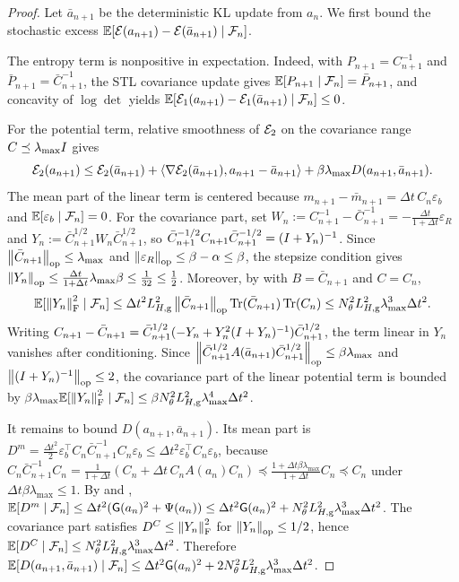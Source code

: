 \begin{proof}
Let $\bar a_{n+1}$ be the deterministic KL update from $a_n$. We first bound the stochastic
excess $\mathbb{E}[\mathcal{E}(a_{n+1})-\mathcal{E}(\bar a_{n+1})\mid\mathcal{F}_n]$.

The entropy term is nonpositive in expectation. Indeed, with $P_{n+1}=C_{n+1}^{-1}$ and
$\bar P_{n+1}=\bar C_{n+1}^{-1}$, the STL covariance update gives
$\mathbb{E}[P_{n+1}\mid\mathcal{F}_n]=\bar P_{n+1}$, and concavity of $\log\det$ yields
$\mathbb{E}[\mathcal{E}_1(a_{n+1})-\mathcal{E}_1(\bar a_{n+1})\mid\mathcal{F}_n]\leq0$.

For the potential term, relative smoothness of $\mathcal{E}_2$ on the covariance range
$C\preceq\lambda_{\max}I$ gives
\[
    \mathcal{E}_2(a_{n+1})
    \leq
    \mathcal{E}_2(\bar a_{n+1})
    +
    \left\langle \nabla\mathcal{E}_2(\bar a_{n+1}),a_{n+1}-\bar a_{n+1}\right\rangle
    +
    \beta\lambda_{\max}D(a_{n+1},\bar a_{n+1}).
\]
The mean part of the linear term is centered because
$m_{n+1}-\bar m_{n+1}=\Delta t\,C_n\varepsilon_b$ and
$\mathbb{E}[\varepsilon_b\mid\mathcal{F}_n]=0$. For the covariance part, set
$W_n:=C_{n+1}^{-1}-\bar C_{n+1}^{-1}=-\tfrac{\Delta t}{1+\Delta t}\varepsilon_R$ and
$Y_n:=\bar C_{n+1}^{1/2}W_n\bar C_{n+1}^{1/2}$, so
$\bar C_{n+1}^{-1/2}C_{n+1}\bar C_{n+1}^{-1/2}=(I+Y_n)^{-1}$.
Since $\left\lVert \bar C_{n+1}\right\rVert_{\mathrm{op}}\leq\lambda_{\max}$ and
$\left\lVert \varepsilon_R\right\rVert_{\mathrm{op}}\leq\beta-\alpha\leq\beta$, the stepsize condition gives
$\left\lVert Y_n\right\rVert_{\mathrm{op}}\leq\tfrac{\Delta t}{1+\Delta t}\lambda_{\max}\beta\leq\tfrac1{32}\leq\tfrac12$.
Moreover, by  with $B=\bar C_{n+1}$ and $C=C_n$,
\[
    \mathbb{E}[\left\lVert Y_n\right\rVert_{\mathrm{F}}^2\mid\mathcal{F}_n]
    \leq
    \Delta t^2
    L_{H,\mathrm g}^2\left\lVert \bar C_{n+1}\right\rVert_{\mathrm{op}}\operatorname{Tr}(\bar C_{n+1})\operatorname{Tr}(C_n)
    \leq
    N_\theta^2L_{H,\mathrm g}^2\lambda_{\max}^3\Delta t^2 .
\]
Writing
$C_{n+1}-\bar C_{n+1}=\bar C_{n+1}^{1/2}(-Y_n+Y_n^2(I+Y_n)^{-1})\bar C_{n+1}^{1/2}$,
the term linear in $Y_n$ vanishes after conditioning. Since
$\left\lVert \bar C_{n+1}^{1/2}A(\bar a_{n+1})\bar C_{n+1}^{1/2}\right\rVert_{\mathrm{op}}\leq\beta\lambda_{\max}$ and
$\left\lVert (I+Y_n)^{-1}\right\rVert_{\mathrm{op}}\leq2$, the covariance part of the linear potential term is bounded by
$\beta\lambda_{\max}\mathbb{E}[\left\lVert Y_n\right\rVert_{\mathrm{F}}^2\mid\mathcal{F}_n]\leq\beta N_\theta^2L_{H,\mathrm g}^2\lambda_{\max}^4\Delta t^2$.

It remains to bound $D(a_{n+1},\bar a_{n+1})$. Its mean part is
$D^m=\tfrac{\Delta t^2}{2}\varepsilon_b^\top C_n\bar C_{n+1}^{-1}C_n\varepsilon_b\leq\Delta t^2\varepsilon_b^\top C_n\varepsilon_b$,
because
$C_n\bar C_{n+1}^{-1}C_n=\tfrac1{1+\Delta t}(C_n+\Delta t\,C_nA(a_n)C_n)\preceq\tfrac{1+\Delta t\beta\lambda_{\max}}{1+\Delta t}C_n\preceq C_n$
under $\Delta t\beta\lambda_{\max}\leq1$. By  and ,
$\mathbb{E}[D^m\mid\mathcal{F}_n]\leq\Delta t^2(\mathsf{G}(a_n)^2+\Psi(a_n))\leq\Delta t^2\mathsf{G}(a_n)^2+N_\theta^2L_{H,\mathrm g}^2\lambda_{\max}^3\Delta t^2$.
The covariance part satisfies $D^C\leq\left\lVert Y_n\right\rVert_{\mathrm{F}}^2$ for $\left\lVert Y_n\right\rVert_{\mathrm{op}}\leq1/2$, hence
$\mathbb{E}[D^C\mid\mathcal{F}_n]\leq N_\theta^2L_{H,\mathrm g}^2\lambda_{\max}^3\Delta t^2$. Therefore
$\mathbb{E}[D(a_{n+1},\bar a_{n+1})\mid\mathcal{F}_n]\leq\Delta t^2\mathsf{G}(a_n)^2+2N_\theta^2L_{H,\mathrm g}^2\lambda_{\max}^3\Delta t^2$.


\end{proof}
